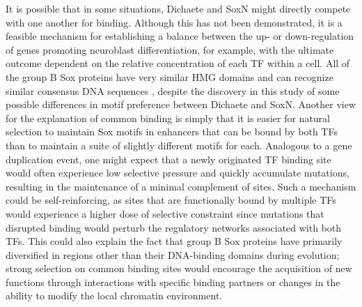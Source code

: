 It is possible that in some situations, Dichaete and SoxN might directly compete with one another for binding. Although this has not been demonstrated, it is a feasible mechanism for establishing a balance between the up- or down-regulation of genes promoting neuroblast differentiation, for example, with the ultimate outcome dependent on the relative concentration of each TF within a cell. All of the group B Sox proteins have very similar HMG domains and can recognize similar consensus DNA sequences \citep{mckimmie_conserved_2005}, despite the discovery in this study of some possible differences in motif preference between Dichaete and SoxN. Another view for the explanation of common binding is simply that it is easier for natural selection to maintain Sox motifs in enhancers that can be bound by both TFs than to maintain a suite of slightly different motifs for each. Analogous to a gene duplication event, one might expect that a newly originated TF binding site would often experience low selective pressure and quickly accumulate mutations, resulting in the maintenance of a minimal complement of sites. Such a mechanism could be self-reinforcing, as sites that are functionally bound by multiple TFs would experience a higher dose of selective constraint since mutations that disrupted binding would perturb the regulatory networks associated with both TFs. This could also explain the fact that group B Sox proteins have primarily diversified in regions other than their DNA-binding domains during evolution; strong selection on common binding sites would encourage the acquisition of new functions through interactions with specific binding partners or changes in the ability to modify the local chromatin environment.\\


